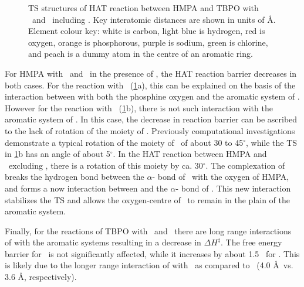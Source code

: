 \begin{doublespace}
\begin{figure}[!htbp]
  \caption[TS structures of HAT reaction between HMPA and TBPO with \cumo\ and
  \bno\ including .]{TS structures of HAT reaction between HMPA and
  TBPO with \cumo\ and \bno\ including . Key interatomic distances are
  shown in units of \AA. Element colour key: white is carbon, light blue is
  hydrogen, red is oxygen, orange is phosphorous, purple is sodium, green is
  chlorine, and peach is a dummy atom in the centre of an aromatic ring.}
  \label{fig:hmpa-tbpo-ts}
\end{figure}

For HMPA with \cumo\ and \bno\ in the presence of , the HAT reaction
barrier decreases in both cases. For the reaction with \cumo\
(\ref{fig:hmpa-tbpo-ts}a), this can be explained on the basis of the interaction
between \ch{Na} with both the phosphine oxygen and the aromatic system of
\cumo. However for the reaction with \bno\ (\ref{fig:hmpa-tbpo-ts}b), there is
not such interaction with the aromatic system of \bno. In this case, the
decrease in reaction barrier can be ascribed to the lack of rotation of the
 moiety of \bno. Previously computational
investigations\cite{Salamone2011a,Salamone2012} demonstrate a typical rotation
of the \ch{CH2O^.} moiety of \bno\ of about 30 to 45$^\circ$, while the TS in
\ref{fig:hmpa-tbpo-ts}b has an angle of about 5$^\circ$. In the HAT reaction
between HMPA and \bno\ excluding , there is a rotation of this moiety
by ca. 30$^\circ$. The complexation of \ch{NaCl} breaks the hydrogen bond
between the $\alpha$- bond of \bno\ with the oxygen of HMPA, and forms a
now interaction between \ch{Cl^-} and the $\alpha$-\ch{C-H} bond of \bno. This
new interaction stabilizes the TS and allows the oxygen-centre of \bno\ to
remain in the plain of the aromatic system.

Finally, for the reactions of TBPO with \cumo\ and \bno\ there are long range
interactions of \ch{Na} with the aromatic systems resulting in a decrease in
$\Delta H^\ddagger$. The free energy barrier for \cumo\ is not significantly
affected, while it increases by about 1.5 \kcalmol\ for \bno. This is likely due
to the longer range interaction of \ch{Na} with \cumo\ as compared to \bno\
(4.0 \AA\ vs. 3.6 \AA, respectively).


\end{doublespace}
